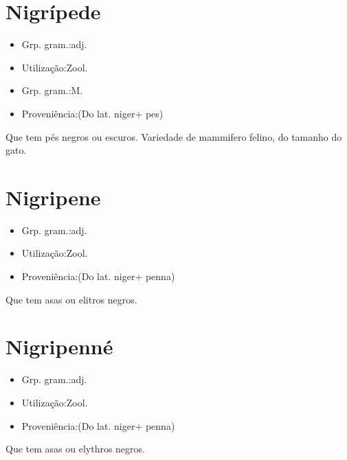 \section{Nigrípede}
\begin{itemize}
\item {Grp. gram.:adj.}
\end{itemize}
\begin{itemize}
\item {Utilização:Zool.}
\end{itemize}
\begin{itemize}
\item {Grp. gram.:M.}
\end{itemize}
\begin{itemize}
\item {Proveniência:(Do lat. \textunderscore niger\textunderscore  + \textunderscore pes\textunderscore )}
\end{itemize}
Que tem pés negros ou escuros.
Variedade de mammifero felino, do tamanho do gato.
\section{Nigripene}
\begin{itemize}
\item {Grp. gram.:adj.}
\end{itemize}
\begin{itemize}
\item {Utilização:Zool.}
\end{itemize}
\begin{itemize}
\item {Proveniência:(Do lat. \textunderscore niger\textunderscore  + \textunderscore penna\textunderscore )}
\end{itemize}
Que tem asas ou elitros negros.
\section{Nigripenné}
\begin{itemize}
\item {Grp. gram.:adj.}
\end{itemize}
\begin{itemize}
\item {Utilização:Zool.}
\end{itemize}
\begin{itemize}
\item {Proveniência:(Do lat. \textunderscore niger\textunderscore  + \textunderscore penna\textunderscore )}
\end{itemize}
Que tem asas ou elythros negros.
